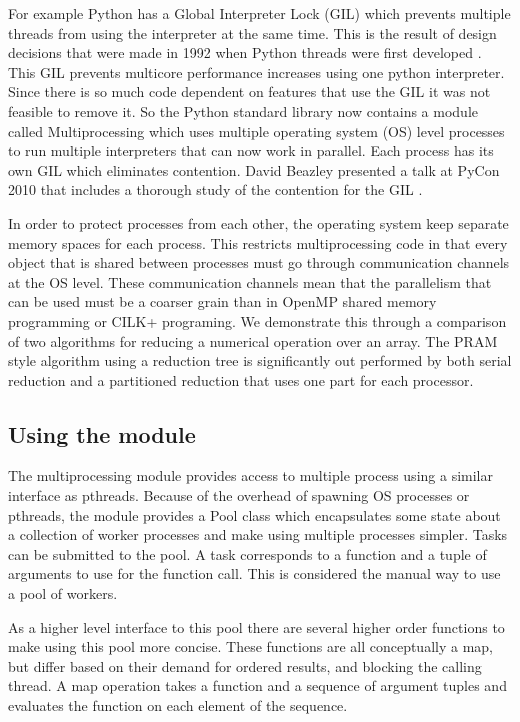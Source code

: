 \documentclass[]{IEEEtran}
\begin{document}
For example Python has a Global Interpreter Lock (GIL) which prevents
multiple threads from using the interpreter at the same time. This is
the result of design decisions that were made in 1992 when Python
threads were first developed \cite{beazley2010}. This GIL prevents
multicore performance increases using one python interpreter. Since
there is so much code dependent on features that use the GIL it was not
feasible to remove it. So the Python standard library now contains a
module called Multiprocessing which uses multiple operating system (OS)
level processes to run multiple interpreters that can now work in
parallel. Each process has its own GIL which eliminates contention.
David Beazley presented a talk at PyCon 2010 that includes a thorough
study of the contention for the GIL \cite{beazley2010}.

In order to protect processes from each other, the operating system keep
separate memory spaces for each process. This restricts multiprocessing
code in that every object that is shared between processes must go
through communication channels at the OS level. These communication
channels mean that the parallelism that can be used must be a coarser
grain than in OpenMP shared memory programming or CILK+ programing. We
demonstrate this through a comparison of two algorithms for reducing a
numerical operation over an array. The PRAM style algorithm using a
reduction tree is significantly out performed by both serial reduction
and a partitioned reduction that uses one part for each processor.

\subsection{Using the module}

The multiprocessing module provides access to multiple process using a
similar interface as pthreads. Because of the overhead of spawning OS
processes or pthreads, the module provides a Pool class which
encapsulates some state about a collection of worker processes and make
using multiple processes simpler. Tasks can be submitted to the pool. A
task corresponds to a function and a tuple of arguments to use for the
function call. This is considered the manual way to use a pool of
workers.

As a higher level interface to this pool there are several higher order
functions to make using this pool more concise. These functions are all
conceptually a map, but differ based on their demand for ordered
results, and blocking the calling thread. A map operation takes a
function and a sequence of argument tuples and evaluates the function on
each element of the sequence.
\end{document}
